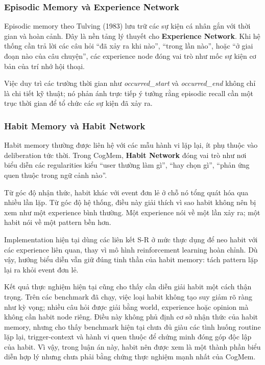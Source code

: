 \documentclass[../main.tex]{subfiles}
\begin{document}
\subsubsection{Episodic Memory và Experience Network}

Episodic memory theo Tulving (1983) lưu trữ các sự kiện cá nhân gắn với thời gian và hoàn cảnh. Đây là nền tảng lý thuyết cho \textbf{Experience Network}. Khi hệ thống cần trả lời các câu hỏi ``đã xảy ra khi nào'', ``trong lần nào'', hoặc ``ở giai đoạn nào của câu chuyện'', các experience node đóng vai trò như mốc sự kiện cơ bản của trí nhớ hội thoại.

Việc duy trì các trường thời gian như \textit{occurred\_start} và \textit{occurred\_end} không chỉ là chi tiết kỹ thuật; nó phản ánh trực tiếp ý tưởng rằng episodic recall cần một trục thời gian để tổ chức các sự kiện đã xảy ra.

\subsubsection{Habit Memory và Habit Network}

Habit memory thường được liên hệ với các mẫu hành vi lặp lại, ít phụ thuộc vào deliberation tức thời. Trong CogMem, \textbf{Habit Network} đóng vai trò như nơi biểu diễn các regularities kiểu ``user thường làm gì'', ``hay chọn gì'', ``phản ứng quen thuộc trong ngữ cảnh nào''.

Từ góc độ nhận thức, habit khác với event đơn lẻ ở chỗ nó tổng quát hóa qua nhiều lần lặp. Từ góc độ hệ thống, điều này giải thích vì sao habit không nên bị xem như một experience bình thường. Một experience nói về một lần xảy ra; một habit nói về một pattern bền hơn.

Implementation hiện tại dùng các liên kết S-R ở mức thực dụng để neo habit với các experience liên quan, thay vì mô hình reinforcement learning hoàn chỉnh. Dù vậy, hướng biểu diễn vẫn giữ đúng tinh thần của habit memory: tách pattern lặp lại ra khỏi event đơn lẻ.

Kết quả thực nghiệm hiện tại cũng cho thấy cần diễn giải habit một cách thận trọng. Trên các benchmark đã chạy, việc loại habit không tạo suy giảm rõ ràng như kỳ vọng; nhiều câu hỏi được giải bằng world, experience hoặc opinion mà không cần habit node riêng. Điều này không phủ định cơ sở nhận thức của habit memory, nhưng cho thấy benchmark hiện tại chưa đủ giàu các tình huống routine lặp lại, trigger-context và hành vi quen thuộc để chứng minh đóng góp độc lập của habit. Vì vậy, trong luận án này, habit nên được xem là một thành phần biểu diễn hợp lý nhưng chưa phải bằng chứng thực nghiệm mạnh nhất của CogMem.
\end{document}
